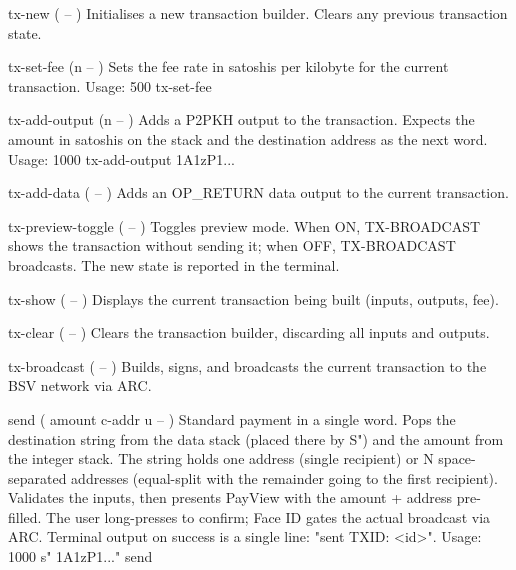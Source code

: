 \documentclass[a4paper, 11pt, openany]{book}
\begin{document}
\begin{forthbox}
  tx-new          ( -- )
                  Initialises a new transaction builder. Clears
                  any previous transaction state.

  tx-set-fee      (n -- )
                  Sets the fee rate in satoshis per kilobyte for
                  the current transaction.
                  Usage: 500 tx-set-fee

  tx-add-output   (n -- )
                  Adds a P2PKH output to the transaction. Expects
                  the amount in satoshis on the stack and the
                  destination address as the next word.
                  Usage: 1000 tx-add-output 1A1zP1...

  tx-add-data     ( -- )
                  Adds an OP\_RETURN data output to the current
                  transaction.

  tx-preview-toggle ( -- )
                  Toggles preview mode. When ON, TX-BROADCAST shows
                  the transaction without sending it; when OFF,
                  TX-BROADCAST broadcasts. The new state is
                  reported in the terminal.

  tx-show         ( -- )
                  Displays the current transaction being built
                  (inputs, outputs, fee).

  tx-clear        ( -- )
                  Clears the transaction builder, discarding all
                  inputs and outputs.

  tx-broadcast    ( -- )
                  Builds, signs, and broadcasts the current
                  transaction to the BSV network via ARC.

  send            ( amount c-addr u -- )
                  Standard payment in a single word. Pops the
                  destination string from the data stack (placed
                  there by S") and the amount from the integer
                  stack. The string holds one address (single
                  recipient) or N space-separated addresses
                  (equal-split with the remainder going to the
                  first recipient). Validates the inputs, then
                  presents PayView with the amount + address
                  pre-filled. The user long-presses to confirm;
                  Face ID gates the actual broadcast via ARC.
                  Terminal output on success is a single line:
                  "sent TXID: <id>".
                  Usage: 1000 s" 1A1zP1..." send


\end{forthbox}
\end{document}
